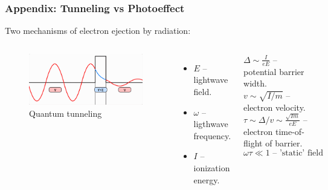 \documentclass{beamer}
\begin{document}
	\begin{frame}
		\frametitle{Appendix: Tunneling vs Photoeffect}
		Two mechanisms of electron ejection by radiation:
		\begin{columns}
			\begin{figure}
				\centering
				\includegraphics[width=\linewidth]{res/tunneling.png}
				\caption*{Quantum tunneling}
			\end{figure}
			\vspace{-10pt}
			\footnotesize
			\begin{itemize}
				\setlength\itemsep{-2pt}
				\item $E$ -- lightwave field.
				\item $\omega$ -- ligthwave frequency.
				\item $I$ -- ionization energy.
			\end{itemize}
			$\Delta \sim \frac{I}{eE}$ -- potential barrier width. \\
			$v \sim \sqrt{I/m}$ -- electron velocity. \\
			$\tau \sim \Delta / v \sim \frac{\sqrt{Im}}{eE}$ -- electron time-of-flight of barrier.
			$$\omega \tau \ll 1 \text{ -- 'static' field condition.}$$
			

\end{columns}
\end{frame}
\end{document}
